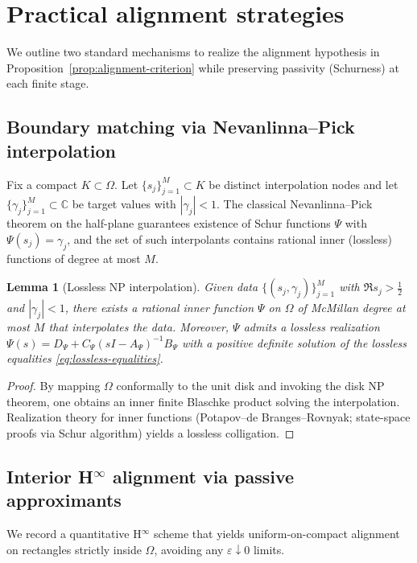 \documentclass[11pt]{article}
\newtheorem{lemma}[theorem]{Lemma}
\theoremstyle{definition}
\theoremstyle{remark}
\newcommand{\C}{\mathbb{C}}
\begin{document}
\section{Practical alignment strategies}\label{sec:practical-alignment}
We outline two standard mechanisms to realize the alignment hypothesis in Proposition~\ref{prop:alignment-criterion} while preserving passivity (Schurness) at each finite stage.

\subsection{Boundary matching via Nevanlinna--Pick interpolation}
Fix a compact \(K\subset\Omega\). Let \(\{s_j\}_{j=1}^{M}\subset K\) be distinct interpolation nodes and let \(\{\gamma_j\}_{j=1}^{M}\subset\C\) be target values with \(|\gamma_j|<1\). The classical Nevanlinna--Pick theorem on the half-plane guarantees existence of Schur functions \(\Psi\) with \(\Psi(s_j)=\gamma_j\), and the set of such interpolants contains rational inner (lossless) functions of degree at most \(M\).

\begin{lemma}[Lossless NP interpolation]\label{lem:NP-lossless}
Given data \(\{(s_j,\gamma_j)\}_{j=1}^{M}\) with \(\Re s_j>\tfrac12\) and \(|\gamma_j|<1\), there exists a rational inner function \(\Psi\) on \(\Omega\) of McMillan degree at most \(M\) that interpolates the data. Moreover, \(\Psi\) admits a lossless realization \(\Psi(s)=D_\Psi+C_\Psi(sI-A_\Psi)^{-1}B_\Psi\) with a positive definite solution of the lossless equalities \eqref{eq:lossless-equalities}.
\end{lemma}
\begin{proof}
By mapping \(\Omega\) conformally to the unit disk and invoking the disk NP theorem, one obtains an inner finite Blaschke product solving the interpolation. Realization theory for inner functions (Potapov--de Branges--Rovnyak; state-space proofs via Schur algorithm) yields a lossless colligation.
\end{proof}

\subsection{Interior H$^\infty$ alignment via passive approximants}\label{subsec:hinf-passive}
We record a quantitative H$^\infty$ scheme that yields uniform-on-compact alignment on rectangles strictly inside \(\Omega\), avoiding any \(\varepsilon\downarrow 0\) limits.
\end{document}
